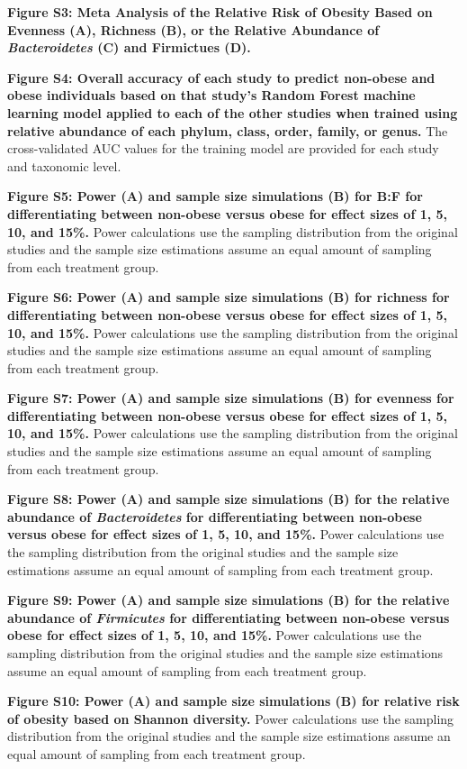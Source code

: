 \documentclass[12pt,]{article}
\begin{document}
\textbf{Figure S3: Meta Analysis of the Relative Risk of Obesity Based
on Evenness (A), Richness (B), or the Relative Abundance of
\emph{Bacteroidetes} (C) and Firmictues (D).}

\textbf{Figure S4: Overall accuracy of each study to predict non-obese
and obese individuals based on that study's Random Forest machine
learning model applied to each of the other studies when trained using
relative abundance of each phylum, class, order, family, or genus.} The
cross-validated AUC values for the training model are provided for each
study and taxonomic level.

\textbf{Figure S5: Power (A) and sample size simulations (B) for B:F for
differentiating between non-obese versus obese for effect sizes of 1, 5,
10, and 15\%.} Power calculations use the sampling distribution from the
original studies and the sample size estimations assume an equal amount
of sampling from each treatment group.

\textbf{Figure S6: Power (A) and sample size simulations (B) for
richness for differentiating between non-obese versus obese for effect
sizes of 1, 5, 10, and 15\%.} Power calculations use the sampling
distribution from the original studies and the sample size estimations
assume an equal amount of sampling from each treatment group.

\textbf{Figure S7: Power (A) and sample size simulations (B) for
evenness for differentiating between non-obese versus obese for effect
sizes of 1, 5, 10, and 15\%.} Power calculations use the sampling
distribution from the original studies and the sample size estimations
assume an equal amount of sampling from each treatment group.

\textbf{Figure S8: Power (A) and sample size simulations (B) for the
relative abundance of \emph{Bacteroidetes} for differentiating between
non-obese versus obese for effect sizes of 1, 5, 10, and 15\%.} Power
calculations use the sampling distribution from the original studies and
the sample size estimations assume an equal amount of sampling from each
treatment group.

\textbf{Figure S9: Power (A) and sample size simulations (B) for the
relative abundance of \emph{Firmicutes} for differentiating between
non-obese versus obese for effect sizes of 1, 5, 10, and 15\%.} Power
calculations use the sampling distribution from the original studies and
the sample size estimations assume an equal amount of sampling from each
treatment group.

\textbf{Figure S10: Power (A) and sample size simulations (B) for
relative risk of obesity based on Shannon diversity.} Power calculations
use the sampling distribution from the original studies and the sample
size estimations assume an equal amount of sampling from each treatment
group.
\end{document}
